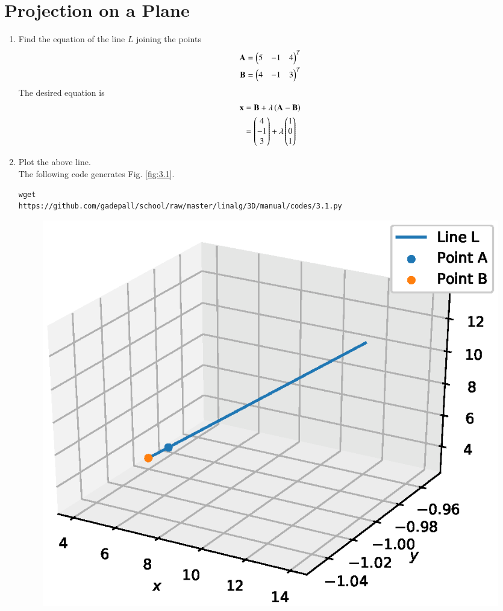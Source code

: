 \documentclass[journal,12pt,twocolumn]{IEEEtran}
\renewcommand\thesection{\arabic{section}}
\begin{document}
\section{Projection on a Plane}
\begin{enumerate}[label=\thesection.\arabic*
,ref=\thesection.\theenumi]
%
\item Find the equation of the line $L$ joining the points 
\begin{align}
\mathbf{A}=\begin{pmatrix}5 & -1 &4\end{pmatrix}^T
\\
\mathbf{B}=\begin{pmatrix}4 & -1 & 3\end{pmatrix}^T
\end{align}
\solution The desired equation is
\begin{align}
\mathbf{x} &= \mathbf{B} + \lambda\left(\mathbf{A}-\mathbf{B}\right)
\\
&= \begin{pmatrix}4 \\ -1 \\ 3\end{pmatrix} + \lambda \begin{pmatrix}1 \\ 0 \\ 1\end{pmatrix}
\label{eq:Lproj}
\end{align}
\item Plot the above line. 
\\
\solution The following code generates Fig. \ref{fig:3.1}.
\begin{lstlisting}
wget 
https://github.com/gadepall/school/raw/master/linalg/3D/manual/codes/3.1.py
\end{lstlisting}
\begin{figure}[!ht]
\centering
\includegraphics[width=\columnwidth]{./figs/3.1.eps}

\end{figure}
\end{enumerate}
\end{document}
